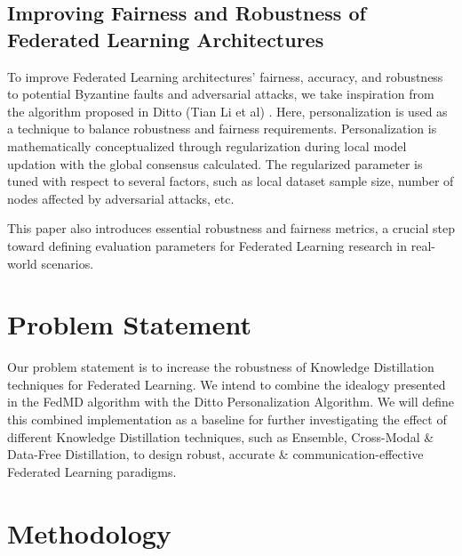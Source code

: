 \documentclass[conference]{IEEEtran}
\begin{document}
\subsection{Improving Fairness and Robustness of Federated Learning Architectures}
To improve Federated Learning architectures' fairness, accuracy, and robustness to potential Byzantine faults and adversarial attacks, we take inspiration from the algorithm proposed in Ditto (Tian Li et al) \cite{b6}. Here, personalization is used as a technique to balance robustness and fairness requirements. Personalization is mathematically conceptualized through regularization during local model updation with the global consensus calculated. The regularized parameter is tuned with respect to several factors, such as local dataset sample size, number of nodes affected by adversarial attacks, etc.

This paper also introduces essential robustness and fairness metrics, a crucial step toward defining evaluation parameters for Federated Learning research in real-world scenarios.

\section{Problem Statement}
Our problem statement is to increase the robustness of Knowledge Distillation techniques for Federated Learning. We intend to combine the idealogy presented in the FedMD algorithm with the Ditto Personalization Algorithm. We will define this combined implementation as a baseline for further investigating the effect of different Knowledge Distillation techniques, such as Ensemble, Cross-Modal \& Data-Free Distillation, to design robust, accurate \& communication-effective Federated Learning paradigms.   
\section{Methodology}
\end{document}
